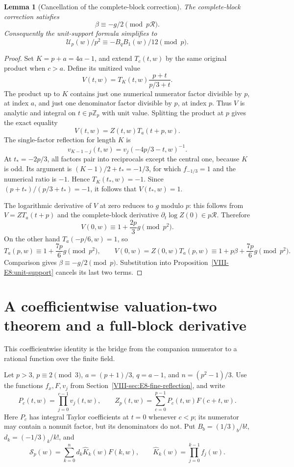 \documentclass[11pt,letterpaper]{article}
\newtheorem{lemma}[theorem]{Lemma}
\numberwithin{equation}{section}
\begin{document}
\begin{lemma}[Cancellation of the complete-block correction]
\label{VIII-E8:beta-cancellation-lemma}
The complete-block correction satisfies
\[
 \beta\equiv-g/2\pmod{p\mathcal R}.
\]
Consequently the unit-support formula simplifies to
\[
 \boxed{\mathcal U_p(w)/p^2\equiv-B_qB_1(w)/12\pmod p.}
\]
\end{lemma}
\begin{proof}
Set $K=p+a=4a-1$, and extend $T_c(t,w)$ by the same original product
when $c>a$. Define its unitized value
\[
 V(t,w)=T_K(t,w)\frac{p+t}{p/3+t}.
\]
The product up to $K$ contains just one numerical numerator factor
divisible by $p$, at index $a$, and just one denominator factor
divisible by $p$, at index $p$. Thus $V$ is analytic and integral
on $t\in p\mathbb Z_p$ with unit value. Splitting the product at $p$
gives the exact equality
\[
 V(t,w)=Z(t,w)T_a(t+p,w).
\]
The single-factor reflection for length $K$ is
\[
 v_{K-1-j}(t,w)=v_j(-4p/3-t,w)^{-1}.
\]
At $t_*=-2p/3$, all factors pair into reciprocals except the central
one, because $K$ is odd. Its argument is
$(K-1)/2+t_*=-1/3$, for which $f_{-1/3}=1$ and the numerical ratio
is $-1$. Hence $T_K(t_*,w)=-1$. Since
$(p+t_*)/(p/3+t_*)=-1$, it follows that $V(t_*,w)=1$.

The logarithmic derivative of $V$ at zero reduces to $g$ modulo $p$:
this follows from $V=ZT_a(t+p)$ and the complete-block derivative
$\partial_t\log Z(0)\in p\mathcal R$. Therefore
\[
 V(0,w)\equiv1+\frac{2p}{3}g\pmod{p^2}.
\]
On the other hand $T_a(-p/6,w)=1$, so
\[
 T_a(p,w)\equiv1+\frac{7p}{6}g\pmod{p^2},\qquad
 V(0,w)=Z(0,w)T_a(p,w)
 \equiv1+p\beta+\frac{7p}{6}g\pmod{p^2}.
\]
Comparison gives $\beta\equiv-g/2\pmod p$. Substitution into
Proposition~\ref{VIII-E8:unit-support} cancels its last two terms.
\end{proof}

\section{A coefficientwise valuation-two theorem and a full-block derivative}\label{loc-VIII-20}
\label{VIII-sec:E8-full-block-derivative}
This coefficientwise identity is the bridge from the companion
numerator to a rational function over the finite field.

Let $p>3$, $p\equiv2\pmod3$, $a=(p+1)/3$, $q=a-1$, and
$n=(p^2-1)/3$. Use the functions $f_x,F,v_j$ from
Section~\ref{VIII-sec:E8-fine-reflection}, and write
\[
 P_c(t,w)=\prod_{j=0}^{c-1}v_j(t,w),\qquad
 Z_p(t,w)=\sum_{c=0}^{p-1}P_c(t,w)F(c+t,w).
\]
Here $P_c$ has integral Taylor coefficients at $t=0$ whenever $c<p$;
its numerator may contain a nonunit factor, but its denominators do not.
Put $B_b=(1/3)_b/b!$, $d_k=(-1/3)_k/k!$, and
\[
 \mathcal S_p(w)=\sum_{k=0}^n d_k\widehat K_k(w)F(k,w),
 \qquad \widehat K_k(w)=\prod_{j=0}^{k-1}f_j(w).
\]
\end{document}
